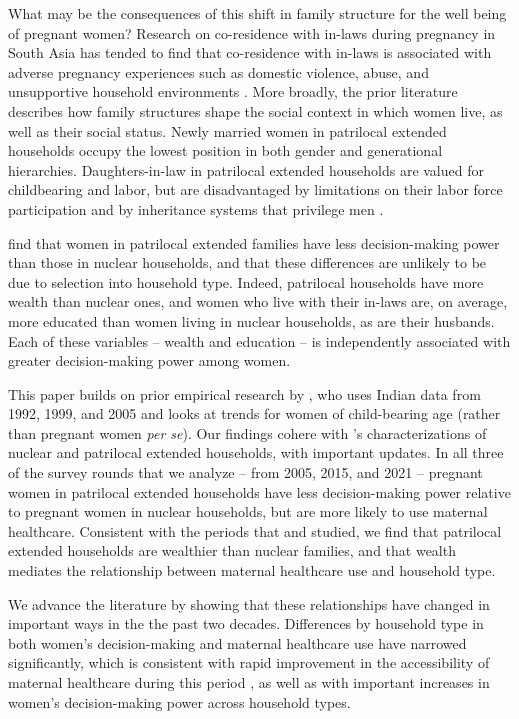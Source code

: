 \documentclass[12pt]{article}
\begin{document}
What may be the consequences of this shift in family structure for the well being of pregnant women? Research on co-residence with in-laws during pregnancy in South Asia has tended to find that co-residence with in-laws is associated with adverse pregnancy experiences such as domestic violence, abuse, and unsupportive household environments \citep{silverman2016maternal,kazi2006social,raj2011abuse}.  More broadly, the prior literature describes how family structures shape the social context in which women live, as well as their social status. Newly married women in patrilocal extended households occupy the lowest position in both gender and generational hierarchies. Daughters-in-law in patrilocal extended households are valued for childbearing and labor, but are disadvantaged by limitations on their labor force participation and by inheritance systems that privilege men \citep{afridi2018fewer, mookerjee2019gender, reed2020labor, chatterjee2022women}.  

\cite{khalil2019patrilocal} find that women in patrilocal extended families have less decision-making power than those in nuclear households, and that these differences are unlikely to be due to selection into household type. Indeed, patrilocal households have more wealth than nuclear ones, and women who live with their in-laws are, on average, more educated than women living in nuclear households, as are their husbands.  Each of these variables -- wealth and education -- is independently associated with greater decision-making power among women.

This paper builds on prior empirical research by \cite{allendorf2013going}, who uses Indian data from 1992, 1999, and 2005 and looks at trends for women of child-bearing age (rather than pregnant women \emph{per se}).  Our findings cohere with  \cite{allendorf2013going}'s characterizations of nuclear and patrilocal extended households, with important updates.  In all three of the survey rounds that we analyze -- from 2005, 2015, and 2021 -- pregnant women in patrilocal extended households have less decision-making power relative to pregnant women in nuclear households, but are more likely to use maternal healthcare. Consistent with the periods that \cite{allendorf2013going} and \cite{khalil2019patrilocal} studied, we find that patrilocal extended households are wealthier than nuclear families, and that wealth mediates the relationship between maternal healthcare use and household type. 

We advance the literature by showing that these relationships have changed in important ways in the the past two decades.  Differences by household type in both women's decision-making and maternal healthcare use have narrowed significantly, which is consistent with rapid improvement in the accessibility of maternal healthcare during this period \citep{gandhi2022predictors, rai2022use}, as well as with important increases in women's decision-making power across household types.  
\end{document}
